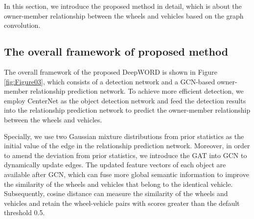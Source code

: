 \documentclass{article}
\begin{document}
		
			
		

In this section, we introduce the proposed method in detail, which is about the owner-member relationship between the wheels and vehicles based on the graph convolution. 

\subsection{The overall framework of proposed method}

The overall framework of the proposed DeepWORD is shown in Figure \ref{fig:Figure03}, which consists of a detection network and a GCN-based owner-member relationship prediction network. To achieve more efficient detection, we employ CenterNet \cite{article24} as the object detection network and feed the detection results into the relationship prediction network to predict the owner-member relationship between the wheels and vehicles.


Specially, we use two Gaussian mixture distributions from prior statistics as the initial value of the edge in the relationship prediction network. Moreover, in order to amend the deviation from prior statistics, we introduce the GAT into GCN to dynamically update edges. The updated feature vectors of each object are available after GCN, which can fuse more global semantic information to improve the similarity of the wheels and vehicles that belong to the identical vehicle. Subsequently, cosine distance can measure the similarity of the wheels and vehicles and retain the wheel-vehicle pairs with scores greater than the default threshold 0.5.

 
\end{document}
